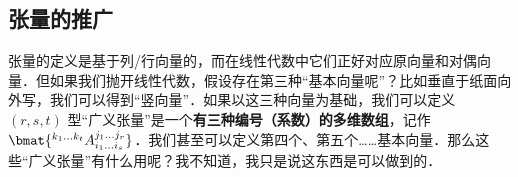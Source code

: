
\subsection{张量的推广}

张量的定义是基于列/行向量的，而在线性代数中它们正好对应原向量和对偶向量．但如果我们抛开线性代数，假设存在第三种“基本向量呢”？比如垂直于纸面向外写，我们可以得到“竖向量”．如果以这三种向量为基础，我们可以定义 $(r, s, t)$ 型“广义张量”是一个\textbf{有三种编号（系数）的多维数组}，记作 $\bmat{{}^{k_1 \dots k_t}A_{i_1 \dots i_s}^{j_1 \dots j_r}}$．我们甚至可以定义第四个、第五个……基本向量．那么这些“广义张量”有什么用呢？我不知道，我只是说这东西是可以做到的．
